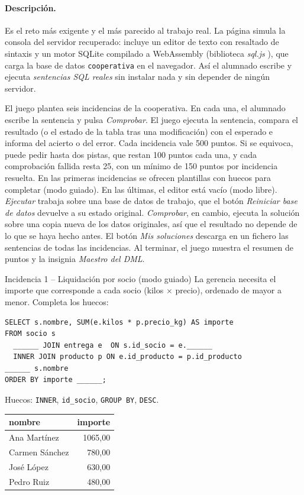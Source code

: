 \documentclass[11pt,a4paper]{article}
\begin{document}
\paragraph{Descripción.} Es el reto más exigente y el más parecido al trabajo real.
La página simula la consola del servidor recuperado: incluye un editor de texto con resaltado
de sintaxis y un motor SQLite compilado a WebAssembly (biblioteca \emph{sql.js} \cite{sqljs}), que carga la
base de datos \texttt{cooperativa} en el navegador. Así el alumnado escribe y ejecuta
\emph{sentencias SQL reales} sin instalar nada y sin depender de ningún servidor.

El juego plantea seis incidencias de la cooperativa. En cada una, el alumnado escribe la
sentencia y pulsa \emph{Comprobar}. El juego ejecuta la sentencia, compara el resultado
(o el estado de la tabla tras una modificación) con el esperado e informa del acierto o del
error. Cada incidencia vale 500 puntos. Si se equivoca, puede pedir hasta dos pistas, que restan 100 puntos cada una, y cada comprobación fallida resta 25, con un mínimo de 150 puntos por incidencia resuelta. En las primeras incidencias
se ofrecen plantillas con huecos para completar (modo guiado). En las últimas, el editor está
vacío (modo libre). \emph{Ejecutar} trabaja sobre una base de datos de trabajo, que el botón
\emph{Reiniciar base de datos} devuelve a su estado original. \emph{Comprobar}, en cambio,
ejecuta la solución sobre una copia nueva de los datos originales, así que el resultado no
depende de lo que se haya hecho antes. El botón \emph{Mis soluciones} descarga en un fichero
las sentencias de todas las incidencias.
Al terminar, el juego muestra el resumen de puntos y la insignia \emph{Maestro del DML}.

\begin{reto}{Incidencia 1 -- Liquidación por socio (modo guiado)}
La gerencia necesita el importe que corresponde a cada socio (kilos $\times$ precio),
ordenado de mayor a menor. Completa los huecos:
\begin{lstlisting}
SELECT s.nombre, SUM(e.kilos * p.precio_kg) AS importe
FROM socio s
  ______ JOIN entrega e  ON s.id_socio = e.______
  INNER JOIN producto p ON e.id_producto = p.id_producto
______ s.nombre
ORDER BY importe ______;
\end{lstlisting}
\end{reto}
\begin{solucion}
Huecos: \texttt{INNER}, \texttt{id\_socio}, \texttt{GROUP BY}, \texttt{DESC}.

\begin{tabular}{@{}lr@{}}
\toprule
\textbf{nombre} & \textbf{importe} \\
\midrule
Ana Martínez   & 1065,00 \\
Carmen Sánchez &  780,00 \\
José López     &  630,00 \\
Pedro Ruiz     &  480,00 \\
\bottomrule
\end{tabular}
\end{solucion}
\end{document}
